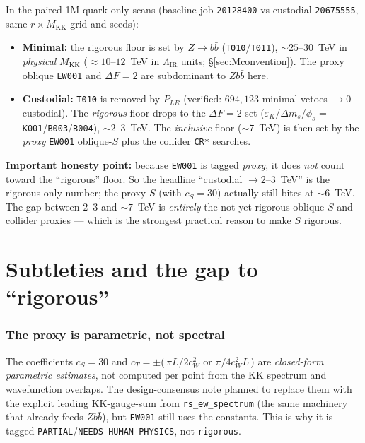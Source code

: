 \documentclass[11pt]{article}
\newcommand{\MKK}{M_{\mathrm{KK}}}
\newcommand{\LIR}{\Lambda_{\mathrm{IR}}}
\newcommand{\cwsq}{c_W^2}
\newcommand{\eps}{\varepsilon}
\newcommand{\PLR}{P_{LR}}
\newcommand{\code}[1]{\texttt{#1}}
\theoremstyle{definition}
\begin{document}
In the paired 1M quark-only scans (baseline job \code{20128400} vs custodial
\code{20675555}, same $r\times\MKK$ grid and seeds):
\begin{itemize}[leftmargin=1.4em]
\item \textbf{Minimal:} the rigorous floor is set by $Z\to b\bar b$
(\code{T010}/\code{T011}), $\sim 25$--$30$~TeV in \emph{physical} $\MKK$
($\approx 10$--$12$~TeV in $\LIR$ units; \S\ref{sec:Mconvention}). The proxy
oblique \code{EW001} and $\Delta F=2$ are subdominant to $Zb\bar b$ here.
\item \textbf{Custodial:} \code{T010} is removed by $\PLR$ (verified:
$694{,}123$ minimal vetoes $\to 0$ custodial). The \emph{rigorous} floor drops to
the $\Delta F=2$ set ($\eps_K$/$\Delta m_s$/$\phi_s$ = \code{K001}/\code{B003}/\code{B004}),
$\sim 2$--$3$~TeV. The \emph{inclusive} floor ($\sim 7$~TeV) is then set by the
\emph{proxy} \code{EW001} oblique-$S$ plus the collider \code{CR*} searches.
\end{itemize}
\textbf{Important honesty point:} because \code{EW001} is tagged \emph{proxy}, it
does \emph{not} count toward the ``rigorous'' floor. So the headline ``custodial
$\to 2$--$3$~TeV'' is the rigorous-only number; the proxy $S$ (with $c_S=30$)
actually still bites at $\sim 6$~TeV. The gap between $2$--$3$ and $\sim 7$~TeV is
\emph{entirely} the not-yet-rigorous oblique-$S$ and collider proxies --- which is
the strongest practical reason to make $S$ rigorous.

\part{Subtleties and the gap to ``rigorous''}
\label{part:subtle}

\section{The proxy is parametric, not spectral}
The coefficients $c_S=30$ and $c_T = \pm$(\,$\pi L/2\cwsq$ or $\pi/4\cwsq L$\,)
are \emph{closed-form parametric estimates}, not computed per point from the KK
spectrum and wavefunction overlaps. The design-consensus note planned to replace
them with the explicit leading KK-gauge-sum from \code{rs\_ew\_spectrum} (the same
machinery that already feeds $Zb\bar b$), but \code{EW001} still uses the
constants. This is why it is tagged \code{PARTIAL}/\code{NEEDS-HUMAN-PHYSICS},
not \code{rigorous}.
\end{document}
